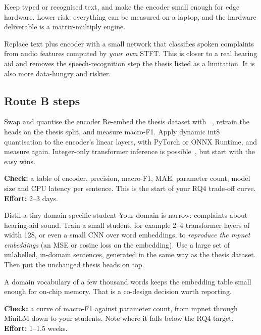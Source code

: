 \begin{description}[style=nextline,leftmargin=1.2em]
  \item[Route B --- compress the text encoder]
  Keep typed or recognised text, and make the encoder small enough for edge
  hardware. Lower risk: everything can be measured on a laptop, and the
  hardware deliverable is a matrix-multiply engine.
  \item[Route C --- recognise intent directly from audio]
  Replace text plus encoder with a small network that classifies spoken
  complaints from audio features computed by \emph{your own} STFT. This is closer
  to a real hearing aid and removes the speech-recognition step the thesis
  listed as a limitation. It is also more data-hungry and riskier.
\end{description}

\subsection{Route B steps}

\begin{stepbox}[label=st:ml:minilm]{Swap and quantise the encoder}
Re-embed the thesis dataset with ~\cite{wang2020minilm},
retrain the heads on the thesis split, and measure macro-F1. Apply dynamic int8
quantisation to the encoder's linear layers, with PyTorch or ONNX Runtime, and
measure again. Integer-only transformer inference is
possible~\cite{kim2021ibert,zafrir2019q8bert}, but start with the easy wins.

\textbf{Check:} a table of encoder, precision, macro-F1, MAE, parameter count,
model size and CPU latency per sentence. This is the start of your RQ4
trade-off curve. \textbf{Effort:} 2--3 days.
\end{stepbox}

\begin{stepbox}[label=st:ml:distil]{Distil a tiny domain-specific student}
Your domain is narrow: complaints about hearing-aid sound. Train a small
student, for example 2--4 transformer layers of width 128, or even a small CNN
over word embeddings, to \emph{reproduce the mpnet embeddings} (an MSE or
cosine loss on the embedding). Use a large set of unlabelled, in-domain
sentences, generated in the same way as the thesis dataset. Then put the
unchanged thesis heads on top.

A domain vocabulary of a few thousand words keeps the embedding table small
enough for on-chip memory. That is a co-design decision worth reporting.

\textbf{Check:} a curve of macro-F1 against parameter count, from mpnet through
MiniLM down to your students. Note where it falls below the RQ4 target.
\textbf{Effort:} 1--1.5 weeks.
\end{stepbox}

